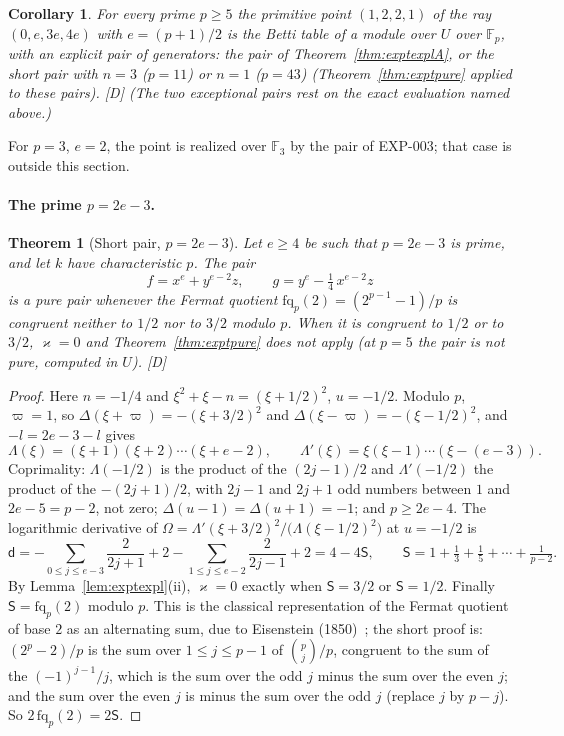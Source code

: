 \documentclass[11pt]{article}
\newtheorem{thmletter}{Theorem}
\newtheorem{corollary}{Corollary}
\theoremstyle{definition}
\theoremstyle{remark}
\newcommand{\EXP}[1]{\mbox{EXP-#1}}
\newcommand{\F}{\mathbb{F}}
\begin{document}
\begin{corollary}\label{cor:exptexplA}
For every prime $p\ge5$ the primitive point $(1,2,2,1)$ of the ray $(0,e,3e,4e)$ with $e=(p+1)/2$ is the Betti table of a module over $U$ over $\F_p$, with an explicit pair of generators: the pair of Theorem~\ref{thm:exptexplA}, or the short pair with $n=3$ ($p=11$) or $n=1$ ($p=43$) (Theorem~\ref{thm:exptpure} applied to these pairs). [D] (The two exceptional pairs rest on the exact evaluation named above.)
\end{corollary}
For $p=3$, $e=2$, the point is realized over $\F_3$ by the pair of \EXP{003}; that case is outside this section.

\paragraph{The prime $p=2e-3$.}

\begin{thmletter}[Short pair, $p=2e-3$]\label{thm:exptexplB}
Let $e\ge4$ be such that $p=2e-3$ is prime, and let $k$ have characteristic $p$. The pair
\[
f=x^e+y^{e-2}z,\qquad g=y^e-\tfrac14\,x^{e-2}z
\]
is a pure pair whenever the Fermat quotient $\mathrm{fq}_p(2)=(2^{p-1}-1)/p$ is congruent neither to $1/2$ nor to $3/2$ modulo $p$. When it is congruent to $1/2$ or to $3/2$, $\varkappa=0$ and Theorem~\ref{thm:exptpure} does not apply (at $p=5$ the pair is not pure, computed in $U$). [D]
\end{thmletter}
\begin{proof}
Here $n=-1/4$ and $\xi^2+\xi-n=(\xi+1/2)^2$, $u=-1/2$. Modulo $p$, $\varpi=1$, so $\Delta(\xi+\varpi)=-(\xi+3/2)^2$ and $\Delta(\xi-\varpi)=-(\xi-1/2)^2$, and $-l=2e-3-l$ gives
\[
\Lambda(\xi)=(\xi+1)(\xi+2)\cdots(\xi+e-2),\qquad\Lambda'(\xi)=\xi(\xi-1)\cdots(\xi-(e-3)).
\]
Coprimality: $\Lambda(-1/2)$ is the product of the $(2j-1)/2$ and $\Lambda'(-1/2)$ the product of the $-(2j+1)/2$, with $2j-1$ and $2j+1$ odd numbers between $1$ and $2e-5=p-2$, not zero; $\Delta(u-1)=\Delta(u+1)=-1$; and $p\ge2e-4$. The logarithmic derivative of $\Omega=\Lambda'(\xi+3/2)^2/\bigl(\Lambda(\xi-1/2)^2\bigr)$ at $u=-1/2$ is
\[
\mathsf d=-\sum_{0\le j\le e-3}\frac2{2j+1}+2-\sum_{1\le j\le e-2}\frac2{2j-1}+2=4-4\mathsf S,\qquad\mathsf S=1+\tfrac13+\tfrac15+\cdots+\tfrac1{p-2}.
\]
By Lemma~\ref{lem:exptexpl}(ii), $\varkappa=0$ exactly when $\mathsf S=3/2$ or $\mathsf S=1/2$. Finally $\mathsf S=\mathrm{fq}_p(2)$ modulo $p$. This is the classical representation of the Fermat quotient of base $2$ as an alternating sum, due to Eisenstein (1850)~\cite{Dobson}; the short proof is: $(2^p-2)/p$ is the sum over $1\le j\le p-1$ of $\binom pj/p$, congruent to the sum of the $(-1)^{j-1}/j$, which is the sum over the odd $j$ minus the sum over the even $j$; and the sum over the even $j$ is minus the sum over the odd $j$ (replace $j$ by $p-j$). So $2\,\mathrm{fq}_p(2)=2\mathsf S$.
\end{proof}
\end{document}
